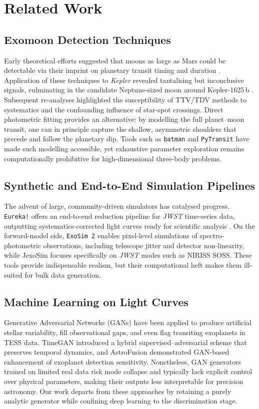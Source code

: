 \documentclass[11pt]{article}
\begin{document}
\section{Related Work}\label{sec:related}
\subsection{Exomoon Detection Techniques}
Early theoretical efforts suggested that moons as large as Mars could be detectable via their imprint on planetary transit timing and duration \citep{Heller2014}.  Application of these techniques to \textit{Kepler} revealed tantalising but inconclusive signals, culminating in the candidate Neptune-sized moon around Kepler-1625\,b \citep{Teachey2018}.  Subsequent re-analyses highlighted the susceptibility of TTV/TDV methods to systematics and the confounding influence of star-spot crossings.  Direct photometric fitting provides an alternative: by modelling the full planet–moon transit, one can in principle capture the shallow, asymmetric shoulders that precede and follow the planetary dip.  Tools such as \texttt{batman} \citep{Kreidberg2015} and \texttt{PyTransit} have made such modelling accessible, yet exhaustive parameter exploration remains computationally prohibitive for high-dimensional three-body problems.

\subsection{Synthetic and End-to-End Simulation Pipelines}
The advent of large, community-driven simulators has catalysed progress.  \texttt{Eureka!} offers an end-to-end reduction pipeline for \textit{JWST} time-series data, outputting systematics-corrected light curves ready for scientific analysis \citep{Bell2022}.  On the forward-model side, \texttt{ExoSim 2} \citep{ExoSim2024} enables pixel-level simulations of spectro-photometric observations, including telescope jitter and detector non-linearity, while JexoSim focuses specifically on \textit{JWST} modes such as NIRISS SOSS.  These tools provide indispensable realism, but their computational heft makes them ill-suited for bulk data generation.

\subsection{Machine Learning on Light Curves}
Generative Adversarial Networks (GANs) have been applied to produce artificial stellar variability, fill observational gaps, and even flag transiting exoplanets in TESS data.  TimeGAN \citep{Yoon2019} introduced a hybrid supervised–adversarial scheme that preserves temporal dynamics, and AstroFusion \citep{Liu2024} demonstrated GAN-based enhancement of exoplanet detection sensitivity.  Nonetheless, GAN generators trained on limited real data risk mode collapse and typically lack explicit control over physical parameters, making their outputs less interpretable for precision astronomy.  Our work departs from these approaches by retaining a purely analytic generator while confining deep learning to the discrimination stage.
\end{document}
